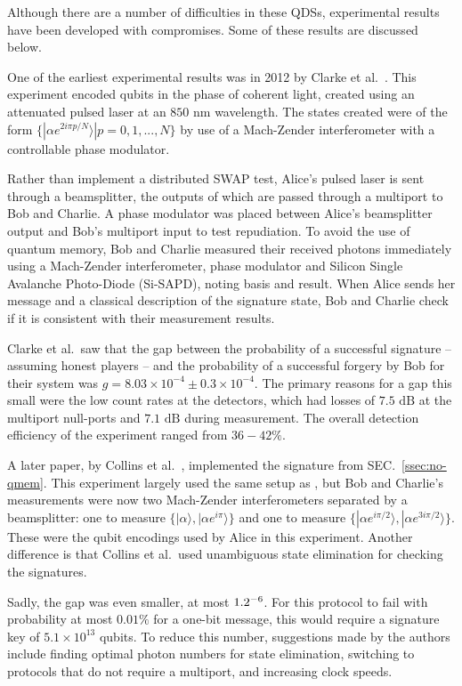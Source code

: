 \documentclass[%
 reprint,
 amsmath,amssymb,
 aps,
 pra,
]{revtex4-1}
\begin{document}
Although there are a number of difficulties in these QDSs, experimental results have been developed with compromises. Some of these results are discussed below.

One of the earliest experimental results was in 2012 by Clarke et al.\ \cite{CCD+12}. This experiment encoded qubits in the phase of coherent light, created using an attenuated pulsed laser at an $850 \text{ nm}$ wavelength. The states created were of the form $\{|\alpha e^{2i\pi p/N}\rangle| p = 0,1,...,N\}$ by use of a Mach-Zender interferometer with a controllable phase modulator.

Rather than implement a distributed SWAP test, Alice's pulsed laser is sent through a beamsplitter, the outputs of which are passed through a multiport to Bob and Charlie. A phase modulator was placed between Alice's beamsplitter output and Bob's multiport input to test repudiation. To avoid the use of quantum memory, Bob and Charlie measured their received photons immediately using a Mach-Zender interferometer, phase modulator and Silicon Single Avalanche Photo-Diode (Si-SAPD), noting basis and result. When Alice sends her message and a classical description of the signature state, Bob and Charlie check if it is consistent with their measurement results.

Clarke et al.\ saw that the gap between the probability of a successful signature -- assuming honest players -- and the probability of a successful forgery by Bob for their system was $g = 8.03 \times 10^{-4} \pm 0.3 \times 10^{-4}$. The primary reasons for a gap this small were the low count rates at the detectors, which had losses of $7.5 \text{ dB}$ at the multiport null-ports and $7.1 \text{ dB}$ during measurement. The overall detection efficiency of the experiment ranged from $36-42\%$.

A later paper, by Collins et al.\ \cite{PhysRevLett.113.040502}, implemented the signature from SEC.\ \ref{ssec:no-qmem}. This experiment largely used the same setup as \cite{CCD+12}, but Bob and Charlie's measurements were now two Mach-Zender interferometers separated by a beamsplitter: one to measure $\{|\alpha\rangle, |\alpha e^{i\pi}\rangle\}$ and one to measure $\{|\alpha e^{i\pi/2}\rangle, |\alpha e^{3i\pi/2}\rangle\}$. These were the qubit encodings used by Alice in this experiment. Another difference is that Collins et al.\ used unambiguous state elimination for checking the signatures.

Sadly, the gap was even smaller, at most $1.2 \time 10^{-6}$. For this protocol to fail with probability at most $0.01\%$ for a one-bit message, this would require a signature key of $5.1 \times 10^{13}$ qubits. To reduce this number, suggestions made by the authors include finding optimal photon numbers for state elimination, switching to protocols that do not require a multiport, and increasing clock speeds.
\end{document}
